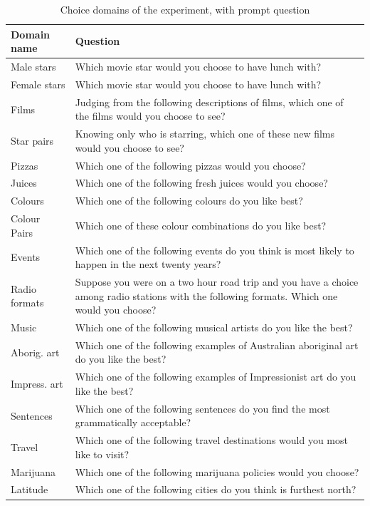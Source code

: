 \documentclass[11pt,letter]{article}
\begin{document}
\begin{table}[h!]
  \begin{center}
    \caption{Choice domains of the experiment, with prompt question}
    \label{t:domains}
    \begin{small}
    \begin{tabular}{lp{12cm}}
      Domain name & Question\\
      \hline
      	Male stars & Which movie star would you choose to have lunch with? \\
		Female stars & Which movie star would you choose to have lunch with? \\
		Films & Judging from the following descriptions of films, which one of the films would you choose to see? \\
		Star pairs & Knowing only who is starring, which one of these new films would you choose to see? \\
		Pizzas & Which one of the following pizzas would you choose? \\
		Juices & Which one of the following fresh juices would you choose? \\
		Colours & Which one of the following colours do you like best? \\
		Colour Pairs & Which one of these colour combinations do you like best? \\
		Events & Which one of the following events do you think is most likely to happen in the next twenty years? \\
		Radio formats & Suppose you were on a two hour road trip and you have a choice among radio stations with the following formats.
Which one would you choose? \\
		Music & Which one of the following musical artists do you like the best? \\
		Aborig. art & Which one of the following examples of Australian aboriginal art do you like the best? \\
		Impress. art & Which one of the following examples of Impressionist art do you like the best? \\
		Sentences & Which one of the following sentences do you find the most grammatically acceptable? \\
		Travel & Which one of the following travel destinations would you most like to visit? \\
		Marijuana & Which one of the following marijuana policies would you choose? \\
		Latitude & Which one of the following cities do you think is furthest north? \\

\end{tabular}
\end{small}
\end{center}
\end{table}
\end{document}
